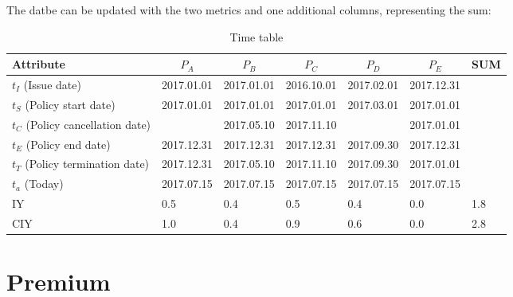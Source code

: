 \documentclass[11pt,a4paper,fleqn]{article}      %
\begin{document}
The datbe can be updated with the two metrics and one additional columns, representing the sum:

\begin{table}[H]
\centering
\caption{Time table}
\label{my-label}
\begin{tabular}{|l|c|c|c|c|c|l|}
\hline
Attribute & $P_A$ & $P_B$ & $P_C$ & $P_D$ & $P_E$ & SUM \\ \hline
$t_{I}$ (Issue date) & \multicolumn{1}{l|}{2017.01.01} & \multicolumn{1}{l|}{2017.01.01} & \multicolumn{1}{l|}{2016.10.01} & \multicolumn{1}{l|}{2017.02.01} & \multicolumn{1}{l|}{2017.12.31} &  \\ \hline
$t_{S}$ (Policy start date) & 2017.01.01 & 2017.01.01 & 2017.01.01 & 2017.03.01 & 2017.01.01 &  \\ \hline
$t_{C}$ (Policy cancellation date) &  & 2017.05.10 & 2017.11.10 &  & 2017.01.01 &  \\ \hline
$t_{E}$ (Policy end date) & 2017.12.31 & 2017.12.31 & 2017.12.31 & 2017.09.30 & 2017.12.31 &  \\ \hline
$t_{T}$ (Policy termination date) & 2017.12.31 & 2017.05.10 & 2017.11.10 & 2017.09.30 & 2017.01.01 &  \\ \hline
$t_{a}$ (Today) & 2017.07.15 & 2017.07.15 & 2017.07.15 & 2017.07.15 & 2017.07.15 &  \\ \hline
IY & \multicolumn{1}{l|}{0.5} & \multicolumn{1}{l|}{0.4} & \multicolumn{1}{l|}{0.5} & \multicolumn{1}{l|}{0.4} & \multicolumn{1}{l|}{0.0} & 1.8 \\ \hline
CIY & \multicolumn{1}{l|}{1.0} & \multicolumn{1}{l|}{0.4} & \multicolumn{1}{l|}{0.9} & \multicolumn{1}{l|}{0.6} & \multicolumn{1}{l|}{0.0} & 2.8 \\ \hline
\end{tabular}
\end{table}

\section{Premium}
\end{document}
